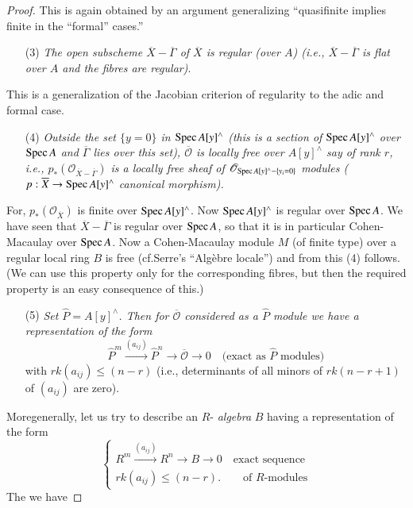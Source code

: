 \begin{proof}
This is again obtained by an argument generalizing ``quasifinite
implies finite in the ``formal'' cases.''
\begin{itemize}
\item[(3)] {\em The open subscheme $\overline{X}-\overline{\Gamma}$ of
  $\overline{X}$ is regular (over $A$) (i.e.,
  $\overline{X}-\overline{\Gamma}$ is flat over $A$ and the fibres are
  regular)}.  
\end{itemize}

This is a generalization of the Jacobian criterion of regularity to
the adic and formal case.
\begin{itemize}
\item[(4)] {\em Outside the set $\{y=0\}$ in $\operatorname{Spec} A[y]^{\wedge}$ (this
  is a section of $\Spec\break A[y]^{\wedge}$ over $\operatorname{Spec} A$ and
  $\overline{\Gamma}$ lies over this set), $\overline{\mathscr{O}}$ is
  locally free over $A[y]^{\wedge}$ say of rank $r$, i.e.,
  $p_{\ast}(\mathscr{O}_{\overline{X}-\overline{\Gamma}})$ is a
  locally free sheaf of $\mathscr{O}_{\operatorname{Spec} A[y]^{\wedge}-\{y_{i}=0\}}$
    modules ($p:\overline{X}\to \operatorname{Spec} A[y]^{\wedge}$ canonical morphism).}
\end{itemize}

For, $p_{\ast}(\mathscr{O}_{\overline{X}})$ is finite over $\operatorname{Spec}
A[y]^{\wedge}$. Now $\operatorname{Spec} A[y]^{\wedge}$ is regular over $\operatorname{Spec} A$. We have
seen that $\overline{X}-\overline{\Gamma}$ is regular over $\operatorname{Spec} A$,
so that it is in particular Cohen-Macaulay over $\operatorname{Spec} A$. Now a
Cohen-Macaulay module $M$ (of finite type) over a regular local ring
$B$ is free (cf.\@ Serre's ``Alg\`ebre locale'') and from this (4)
follows. (We can use this property only for the corresponding fibres,
but then the required property is an easy consequence of this.)
\begin{itemize}
\item[(5)] {\em Set $\hat{P}=A[y]^{\wedge}$. Then for
  $\overline{\mathscr{O}}$ considered as a $\hat{P}$ module we have a
  representation of the form}
$$
\hat{P}^{m}\xrightarrow{(a_{ij})}\hat{P}^{n}\to
\overline{\mathscr{O}}\to 0\quad\text{(exact as $\hat{P}$ modules)}
$$
with $rk(a_{ij})\leq (n-r)$ (i.e., determinants of all minors of
$rk(n-r+1)$ of $(a_{ij})$ are zero). 
\end{itemize}

More\pageoriginale generally, let us try to describe an $R$-{\em
  algebra} $B$ having a representation of the form
\begin{equation*}
\begin{cases}
R^{m}\xrightarrow{(a_{ij})}R^{n}\to B\to 0\quad\text{exact sequence}\\
rk(a_{ij})\leq (n-r).\qquad \text{of $R$-modules}
\end{cases}\tag{*}
\end{equation*}
The we have
\end{proof}

